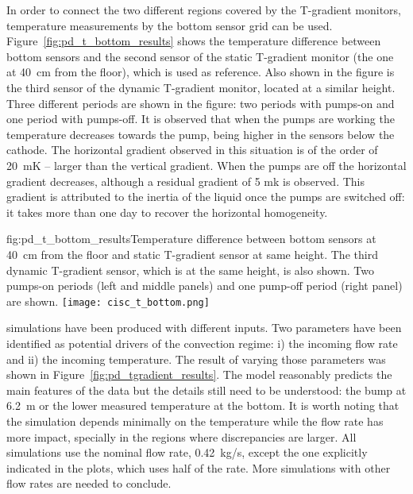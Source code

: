 In order to connect the two different %
regions covered by the T-gradient monitors, temperature measurements by the bottom sensor grid can be used. Figure~\ref{fig:pd_t_bottom_results} shows the temperature difference between bottom sensors and the second sensor of the static T-gradient monitor (the one at 40~cm from the floor), which is used as reference. %
Also shown in the figure is the third sensor of the dynamic T-gradient monitor, located at a similar height. Three different periods are shown in the figure: two periods with pumps-on and one period with pumps-off. It is observed that when the pumps are working the temperature decreases towards the  pump, being  higher in the sensors below the cathode. The horizontal gradient observed in this situation is of the order of 20~mK -- larger than the vertical gradient. When the pumps are off the horizontal gradient decreases, although a residual gradient of 5 mk is observed. This gradient is attributed to the inertia of the liquid once the pumps are switched off: it takes more than one day to recover the horizontal homogeneity.    

\begin{dunefigure}{fig:pd_t_bottom_results}{Temperature difference between bottom sensors at 40~cm from the floor and static T-gradient sensor at same height. The third dynamic T-gradient sensor, which is  at the same height, is also shown. Two pumps-on periods (left and middle panels) and one pump-off period (right panel) are shown.}
  \texttt{[image: cisc\_t\_bottom.png]}%
\end{dunefigure}

 simulations have been produced with different inputs. Two parameters have been identified as potential drivers of the convection regime: i) the incoming  flow rate and ii) the incoming  temperature. The result of varying those parameters was shown in Figure~\ref{fig:pd_tgradient_results}. 
The  model reasonably predicts the main features of the data but the details still need to be understood: the bump at 6.2~m or the lower measured temperature at the bottom. It is worth noting that the simulation depends minimally on the  temperature while the flow rate has more impact, specially in the regions where discrepancies are larger. All simulations use the nominal  flow rate, 0.42~kg/s, except the one explicitly indicated 
in the plots, which uses half of the rate. More simulations with other  flow rates are needed to conclude.  

